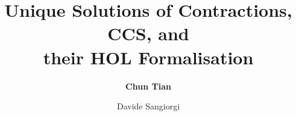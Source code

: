 \documentclass{beamer}
\begin{document}
\title[Unique Solutions of Contractions, ...]{Unique Solutions of
  Contractions, CCS, and\\
 their HOL Formalisation}

\author[C. Tian and D. Sangiorgi]{\textbf{Chun Tian}  \and
  Davide Sangiorgi }



\begin{frame}
\titlepage
\end{frame}


\end{document}
